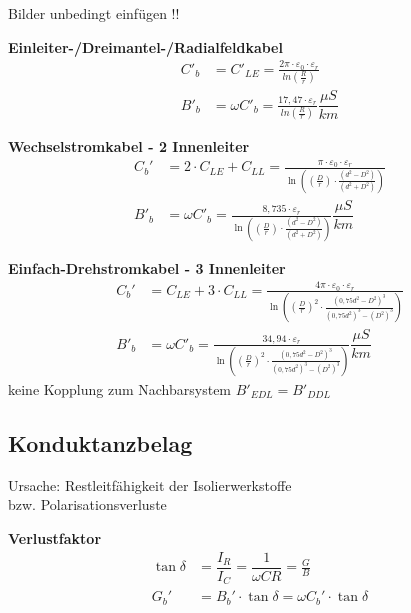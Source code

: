 Bilder unbedingt einfügen !!

\textbf{Einleiter-/Dreimantel-/Radialfeldkabel}
\begin{align*}
    C'_b &= C'_{LE} = \frac{2\pi \cdot \varepsilon_0 \cdot \varepsilon_r}{ln \left( \frac{R}{r} \right)}\\
    B'_b &= \omega C'_b  = \frac{17,47 \cdot \varepsilon_r}{ln \left(\frac{R}{r} \right)} \dfrac{\mu S}{km}
\end{align*}

\textbf{Wechselstromkabel - 2 Innenleiter}
\begin{align*}
    C_{b}' &= 2 \cdot C_{LE} + C_{LL} = \frac{\pi \cdot \varepsilon_{0} \cdot \varepsilon_{r}}{\ln \left( \left(\frac{D}{r}\right) \cdot \frac{(d^2 - D^2)}{(d^2 + D^2)} \right)}\\
    B'_b  &= \omega C'_b = \frac{8,735 \cdot \varepsilon_{r}}{\ln \left( \left(\frac{D}{r}\right) \cdot \frac{(d^2 - D^2)}{(d^2 + D^2)} \right)} \dfrac{\mu S}{km}
\end{align*}

\textbf{Einfach-Drehstromkabel - 3 Innenleiter}
\begin{align*}
    C_{b}' &= C_{LE} + 3 \cdot C_{LL} = \frac{4 \pi \cdot \varepsilon_{0} \cdot \varepsilon_{r}}{\ln \left( \left(\frac{D}{r}\right)^2 \cdot \frac{(0,75d^2 - D^2)^3}{(0,75d^2)^3 - (D^2)^3} \right)}\\
    B'_b &= \omega C'_b = \frac{34,94 \cdot \varepsilon_{r}}{\ln \left( \left(\frac{D}{r}\right)^2 \cdot \frac{(0,75d^2 - D^2)^3}{(0,75d^2)^3 - (D^2)^3} \right)}
     \dfrac{\mu S}{km}
\end{align*}
\indent keine Kopplung zum Nachbarsystem $B'_{\mathit{EDL}} = B'_{\mathit{DDL}}$

\subsection{Konduktanzbelag}
Ursache: Restleitfähigkeit der Isolierwerkstoffe\\ \indent bzw. Polarisationsverluste

\textbf{Verlustfaktor}
\begin{align*}
    \tan \delta &= \dfrac{I_{R}}{I_{C}} = \dfrac{1}{\omega C R} = \frac{G}{B}\\
    G_{b}' &= B_{b}' \cdot \tan \delta = \omega C_{b}' \cdot \tan \delta
\end{align*}
\begin{center}

\end{center}

